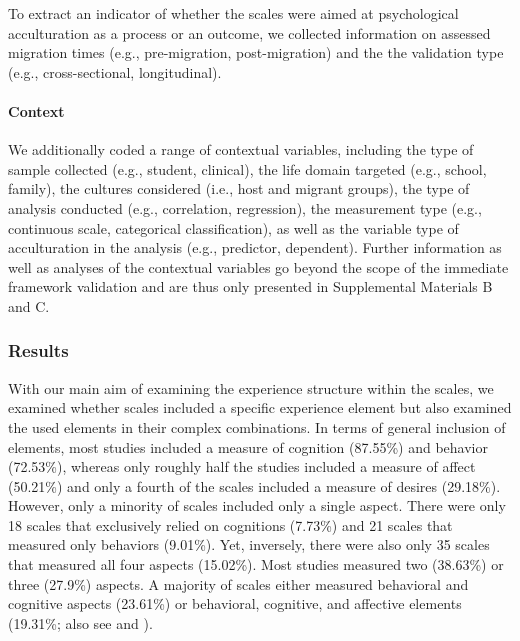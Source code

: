 To extract an indicator of whether the scales were aimed at
psychological acculturation as a process or an outcome, we collected
information on assessed migration times (e.g., pre-migration,
post-migration) and the the validation type (e.g., cross-sectional,
longitudinal).

\paragraph{Context}

We additionally coded a range of contextual variables, including the
type of sample collected (e.g., student, clinical), the life domain
targeted (e.g., school, family), the cultures considered (i.e., host and
migrant groups), the type of analysis conducted (e.g., correlation,
regression), the measurement type (e.g., continuous scale, categorical
classification), as well as the variable type of acculturation in the
analysis (e.g., predictor, dependent). Further information as well as
analyses of the contextual variables go beyond the scope of the
immediate framework validation and are thus only presented in
Supplemental Materials B and C.

\subsubsection{Results}

With our main aim of examining the experience structure within the
scales, we examined whether scales included a specific experience
element but also examined the used elements in their complex
combinations. In terms of general inclusion of elements, most studies
included a measure of cognition (87.55\%) and behavior (72.53\%),
whereas only roughly half the studies included a measure of affect
(50.21\%) and only a fourth of the scales included a measure of desires
(29.18\%). However, only a minority of scales included only a single
aspect. There were only 18 scales that exclusively relied on cognitions
(7.73\%) and 21 scales that measured only behaviors (9.01\%). Yet,
inversely, there were also only 35 scales that measured all four aspects
(15.02\%). Most studies measured two (38.63\%) or three (27.9\%)
aspects. A majority of scales either measured behavioral and cognitive
aspects (23.61\%) or behavioral, cognitive, and affective elements
(19.31\%; also see  and
).

